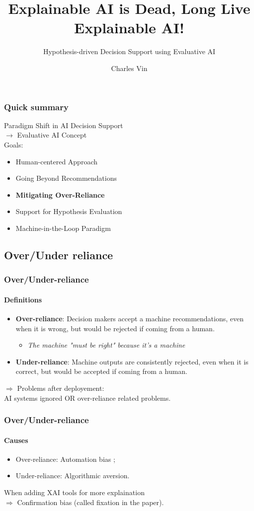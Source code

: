 \documentclass[compress,12pt]{beamer}
\title{Explainable AI is Dead, Long Live Explainable AI!}
\subtitle{Hypothesis-driven Decision Support using Evaluative AI}
\date{}
\author{Charles Vin}
\institute{Sorbonne Université - 21216136}
\begin{document}
\frame[plain]{\titlepage}

\begin{frame}
      \frametitle{Quick summary}
      Paradigm Shift in AI Decision Support \\
      $\rightarrow$ Evaluative AI Concept \\
      Goals:
      \begin{itemize}
            \item Human-centered Approach
            \item Going Beyond Recommendations
            \item \textbf{Mitigating Over-Reliance}
            \item Support for Hypothesis Evaluation
            \item Machine-in-the-Loop Paradigm
      \end{itemize}
\end{frame}

\subsection{Over/Under reliance}
\begin{frame}
      \frametitle{Over/Under-reliance}
      \framesubtitle{Definitions}
      \begin{itemize}
            \item \textbf{Over-reliance}: Decision makers accept a machine recommendations, even when it is wrong, but would be rejected if coming from a human. \begin{itemize}
                  \item \textit{The machine "must be right" because it's a machine}
            \end{itemize}
            \item \textbf{Under-reliance}: Machine outputs are consistently rejected, even when it is correct, but would be accepted if coming from a human. 
      \end{itemize}
      $ \Rightarrow  $ Problems after deployement: \\ 
      AI systems ignored OR over-reliance related problems.
\end{frame}

\begin{frame}
      \frametitle{Over/Under-reliance}
      \framesubtitle{Causes}
      \begin{itemize}
            \item Over-reliance: Automation bias ;
            \item Under-reliance: Algorithmic aversion.
      \end{itemize}
      When adding XAI tools for more explaination \\
      $ \Rightarrow $ Confirmation bias (called fixation in the paper).
\end{frame}
\end{document}
